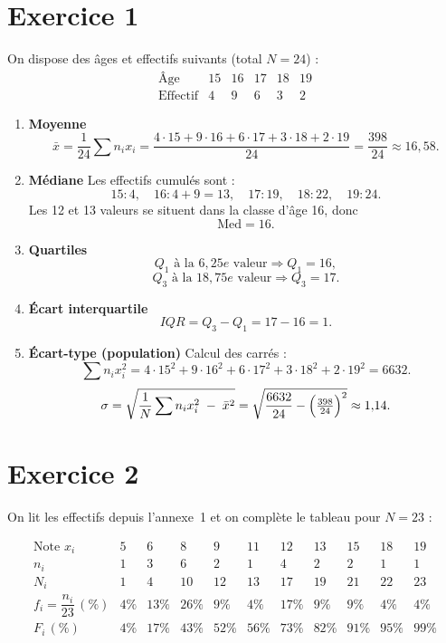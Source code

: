 \documentclass{article}
\theoremstyle{definition}
\begin{document}
\section*{Exercice 1}
On dispose des âges et effectifs suivants (total $N=24$) :
\[
\begin{array}{c|ccccc}
\text{Âge}       & 15 & 16 & 17 & 18 & 19 \\ \hline
\text{Effectif}  &  4 &  9 &  6 &  3 &  2
\end{array}
\]

\begin{enumerate}
  \item \textbf{Moyenne} 
    \[
      \bar{x} = \frac{1}{24}\sum n_i x_i
      = \frac{4\cdot15 + 9\cdot16 + 6\cdot17 + 3\cdot18 + 2\cdot19}{24}
      = \frac{398}{24}
      \approx 16{,}58.
    \]
    
  \item \textbf{Médiane}  
    Les effectifs cumulés sont :  
    \[
      15 :4,\quad 16:4+9=13,\quad 17:19,\quad 18:22,\quad 19:24.
    \]
    Les 12 et 13 valeurs se situent dans la classe d’âge 16, donc
    \[
      \mathrm{Med} = 16.
    \]

  \item \textbf{Quartiles}  
    \[
      Q_1 \text{ à la } 6,25\!e\text{ valeur}
      \Longrightarrow Q_1 = 16,
    \]
    \[
      Q_3 \text{ à la } 18,75\!e\text{ valeur}
      \Longrightarrow Q_3 = 17.
    \]

  \item \textbf{Écart interquartile}  
    \[
      IQR = Q_3 - Q_1 = 17 - 16 = 1.
    \]

  \item \textbf{Écart-type (population)}  
    Calcul des carrés :  
    \[
      \sum n_i x_i^2
      = 4\cdot15^2 + 9\cdot16^2 + 6\cdot17^2 + 3\cdot18^2 + 2\cdot19^2
      = 6632.
    \]
    \[
      \sigma
      = \sqrt{\frac{1}{N}\sum n_i x_i^2 \;-\;\bar{x}^{2}}
      = \sqrt{\frac{6632}{24} - \Bigl(\tfrac{398}{24}\Bigr)^{2}}
      \approx 1{,}14.
    \]
\end{enumerate}

\section*{Exercice 2}
On lit les effectifs depuis l'annexe~1 et on complète le tableau pour $N=23$ :

\[
\begin{array}{c|*{5}{c}|*{5}{c}}
\text{Note }x_i & 5 & 6 & 8 & 9 & 11 & 12 & 13 & 15 & 18 & 19 \\ \hline
n_i            & 1 & 3 & 6 & 2 &  1 &  4 &  2 &  2 &  1 &  1 \\ \hline
N_i            & 1 & 4 & 10 & 12 & 13 & 17 & 19 & 21 & 22 & 23 \\ \hline
f_i=\dfrac{n_i}{23}\,( \%) 
               & 4\% & 13\% & 26\% & 9\% & 4\% & 17\% & 9\% & 9\% & 4\% & 4\% \\ \hline
F_i \,( \%) 
               & 4\% & 17\% & 43\% & 52\% & 56\% & 73\% & 82\% & 91\% & 95\% & 99\% 
\end{array}
\]
\end{document}

